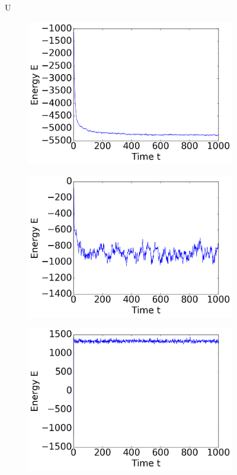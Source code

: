 \begin{figure}[ht]
\begin{subfigure}{0.3\textwidth}
\end{subfigure}

U
\hfill
\begin{subfigure}{0.3\textwidth}
\includegraphics[width=\textwidth]{../dat/Total_Energy_T0d3.png}
\end{subfigure}
\hfill
\begin{subfigure}{0.3\textwidth}
\includegraphics[width=\textwidth]{../dat/Total_Energy_T1d0.png}
\end{subfigure}
\hfill
\begin{subfigure}{0.3\textwidth}
\includegraphics[width=\textwidth]{../dat/Total_Energy_T2d0.png}

\end{subfigure}
\end{figure}
